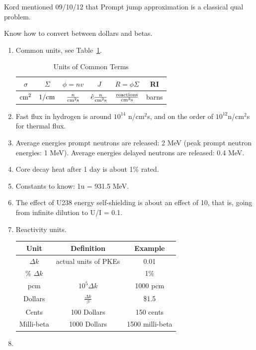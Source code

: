 \documentclass{school-22.211-notes}
\date{May 23, 2012}
\begin{document}
\maketitle

Kord mentioned 09/10/12 that Prompt jump approximation is a classical qual problem.

Know how to convert between dollars and betas. 

\begin{enumerate}
\item Common units, see Table~\ref{units}.
\begin{table}[ht]
  \centering
  \begin{tabular}{|c|c|c|c|c|c|} \hline
   $\sigma$ & $\Sigma$ & $\phi = nv$  & $J$ & $R = \phi \Sigma$ & RI  \\ \hline
   $\mathrm{cm}^2$ & $1/\mathrm{cm}$ & $\frac{n}{\mathrm{cm}^2 \mathrm{s}}$  & $\hat{e} \frac{n}{\mathrm{cm}^2 \mathrm{s}}$ & $\frac{\mathrm{reactions}}{\mathrm{cm}^3 \mathrm{s}}$ & barns \\ \hline
  \end{tabular}
  \caption{Units of Common Terms} \label{units}
\end{table}
\item Fast flux in hydrogen is around $10^{14}$ n/cm$^2$s, and on the order of $10^{12}$n/cm$^2$s for thermal flux. 
\item Average energies prompt neutrons are released: 2 MeV (peak prompt neutron energies: 1 MeV). Average energies delayed neutrons are released: 0.4 MeV. 
\item Core decay heat after 1 day is about 1\% rated. 
\item Constants to know: 1u = 931.5 MeV. 
\item The effect of U238 energy self-shielding is about an effect of 10, that is, going from infinite dilution to U/I = 0.1. 


\item Reactivity units. 
\begin{table}[ht]
  \centering
  \begin{tabular}{|c|c|c|} \hline
    Unit & Definition & Example \\ \hline
    $\Delta k$ & actual units of PKEs & 0.01 \\
    \% $\Delta k$ & & 1\% \\
    pcm & $10^5 \Delta k $ & 1000 pcm \\ \hline
    Dollars & $\frac{\Delta k}{\beta}$ & \$1.5 \\
    Cents & 100 Dollars & 150 cents \\ 
    Milli-beta & 1000 Dollars & 1500 milli-beta \\ \hline
  \end{tabular}
\end{table}

\item 
\end{enumerate}
\end{document}
